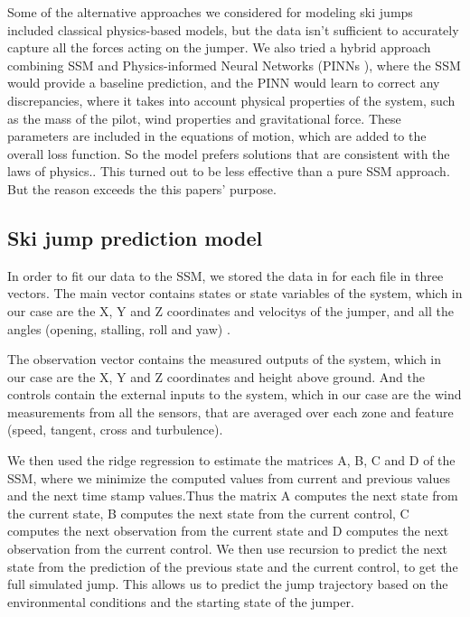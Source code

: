 \documentclass[sigconf,natbib=false, language=english]{acmart}
\begin{document}

Some of the alternative approaches we considered for modeling ski jumps included classical
physics-based models, but the data  isn't sufficient to accurately capture all the forces acting on the jumper.
We also tried a hybrid approach combining SSM and Physics-informed Neural Networks (PINNs \cite{StatQuest_NN_YouTube}), where
the SSM would provide a baseline prediction, and the PINN would learn to correct any discrepancies, where it takes into
account physical properties of the system, such as the mass of the pilot, wind properties and gravitational force. \cite{Cai2021_PINN_FluidMechanics}
These parameters are included in the equations of motion, which are added to the overall loss function. 
So the model prefers solutions that are consistent with the laws of physics.. This
turned out to be less effective than a pure SSM approach. But the reason exceeds the this papers' purpose.


\subsection{Ski jump prediction model}

In order to fit our data to the SSM, we stored the data in for each file in three vectors.
The main vector contains states or state variables of the system, which in our case are the
X, Y and Z coordinates and velocitys of the jumper, and all the angles (opening, stalling, roll and yaw) \cite{CERN_SkiJump_Physics}.

The observation vector contains the measured outputs of the system, which in our case are the X, Y and Z coordinates
and height above ground. And the controls contain the external inputs to the system, which in our case are
the wind measurements from all the sensors, that are averaged over each zone and feature (speed, tangent, cross and turbulence).

We then used the ridge regression to estimate the matrices A, B, C and D of the SSM, where we minimize the computed values from current
and previous values and the next time stamp values.Thus the matrix A computes the next state from the current state, 
B computes the next state from the current control, C computes the next observation from the current state and D computes 
the next observation from the current control. We then use recursion to predict the next state from the prediction of the 
previous state and the current control, to get the full simulated jump. This allows us to predict the jump trajectory 
based on the environmental conditions and the starting state of the jumper. \cite{SSM_YouTube}
\end{document}
